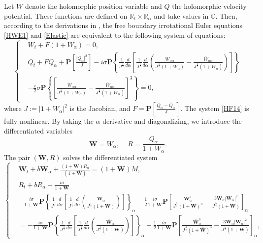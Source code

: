 \documentclass[10pt]{amsart}
\theoremstyle{remark}
\theoremstyle{definition}
\numberwithin{equation}{section}
\newcommand{\al}{\alpha}
\newcommand{\f}{\frac}
\newcommand{\bw}{\mathbf{W}}
\newcommand{\nP}{{\mathbf P}}
\begin{document}
    Let $W$ denote the holomorphic position variable and  $Q$ the holomorphic velocity potential.
    These functions are defined on $\mathbb{R}_t \times \mathbb{R}_\al$ and take values in $\mathbb{C}$.
    Then, according to the derivations in \cite{MR4846707}, the free boundary irrotational Euler equations \eqref{HWE1} and \eqref{Elastic} are equivalent to the following system of equations:
	\begin{equation}\label{HF14}
		\begin{cases}
			&W_t+F(1+W_{\al})=0,\\
			&Q_t+FQ_{\al}+\nP\left[\f{|Q_{\al}|^2}{J}\right]
			-i\sigma \nP\left\{\f{1}{J^{\f12}}\f{d}{d\al}\left[\f{1}{J^{\f12}}\f{d}{d\al}\left(\f{W_{\al\al}}{J^{\f12}(1+W_{\al})}
			-\f{\bar{W}_{\al\al}}{J^{\f12}(1+\bar{W}_{\al})}\right)\right]\right\}\\
			&-\f{i}{2}\sigma \nP\left\{\left[\f{W_{\al\al}}{J^{\f12}(1+W_{\al})}
			-\f{\bar{W}_{\al\al}}{J^{\f12}(1+\bar{W}_{\al})}\right]^3\right\}=0,
		\end{cases}
	\end{equation}
     where $J := |1+W_\alpha|^2$ is the Jacobian, and $F = \nP\left[\frac{Q_\alpha - \bar Q_\alpha}{J}\right]$.
The system \eqref{HF14} is  fully nonlinear.
By taking the $\alpha$ derivative and diagonalizing, we introduce the differentiated variables
    \begin{equation}\label{HF18}
		\mathbf{W}=W_\al, \quad \,R=\frac{Q_\al}{1+W_\al}.
	\end{equation}
    The pair $(\bw, R)$ solves the differentiated system
    \begin{equation}\label{HF19}
		\begin{cases}
&\mathbf{W}_t+b\mathbf{W}_{\al}+\f{(1+\mathbf{W})R_{\al}}{(1+\bar{\mathbf{W}})}=(1+\mathbf{W})M,\\
&R_t+bR_{\al}+\f{ia}{1+\mathbf{W}}\\
&-\f{i\sigma}{1+\mathbf{W}} \nP\left\{\f{1}{J^{\f12}}\f{d}{d\al}\left[\f{1}{J^{\f12}}\f{d}{d\al}\left(\f{\mathbf{W}_{\al}}{J^{\f12}(1+\mathbf{W})}\right)\right]\right\}_{\al}-\f12\f{i\sigma}{1+\mathbf{W}} \nP\left[\f{\mathbf{W}^3_{\al}}{J^{\f32}(1+\mathbf{W})^3}-\f{3\mathbf{W}_{\al}|\mathbf{W}_{\al}|^2}{J^{\f52}(1+\mathbf{W})}\right]_{\al}\\
&=-\f{i\sigma}{1+\mathbf{W}} \nP\left\{\f{1}{J^{\f12}}\f{d}{d\al}\left[\f{1}{J^{\f12}}\f{d}{d\al}\left(\f{\bar{\mathbf{W}}_{\al}}{J^{\f12}(1+\bar{\mathbf{W}})}\right)\right]\right\}_{\al}-\f12\f{i\sigma}{1+\mathbf{W}} \nP\left[\f{\bar{\mathbf{W}}^3_{\al}}{J^{\f32}(1+\bar{\mathbf{W}})^3}
-\f{3\bar{\mathbf{W}}_{\al}|\mathbf{W}_{\al}|^2}{J^{\f52}(1+\bar{\mathbf{W}})}\right]_{\al},
\end{cases}
\end{equation}
\end{document}
